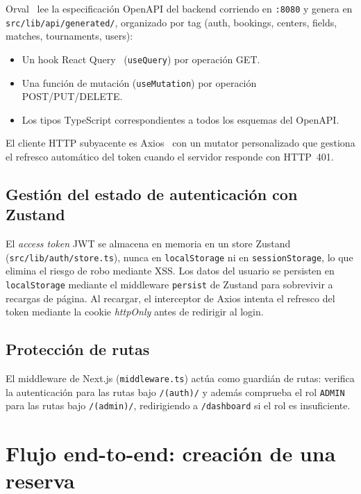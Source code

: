Orval~\cite{orval} lee la especificación OpenAPI del backend corriendo en \texttt{:8080} y
genera en \texttt{src/lib/api/generated/}, organizado por tag (auth, bookings,
centers, fields, matches, tournaments, users):

\begin{itemize}
  \item Un hook React Query~\cite{reactquery} (\texttt{useQuery}) por operación GET.
  \item Una función de mutación (\texttt{useMutation}) por operación
    POST/PUT/DELETE.
  \item Los tipos TypeScript correspondientes a todos los esquemas del OpenAPI.
\end{itemize}

El cliente HTTP subyacente es Axios~\cite{axios} con un mutator personalizado que gestiona
el refresco automático del token cuando el servidor responde con HTTP~401.

\subsection{Gestión del estado de autenticación con Zustand}

\begin{sloppypar}
El \textit{access token} JWT se almacena en memoria en un store
Zustand~\cite{zustand} (\texttt{src/lib/auth/store.ts}), nunca en
\texttt{localStorage} ni en \texttt{sessionStorage}, lo que elimina el riesgo
de robo mediante XSS. Los datos del usuario se persisten en \texttt{localStorage}
mediante el middleware \texttt{persist} de Zustand para sobrevivir a recargas
de página. Al recargar, el interceptor de Axios intenta el refresco del token
mediante la cookie \textit{httpOnly} antes de redirigir al login.
\end{sloppypar}

\subsection{Protección de rutas}

El middleware de Next.js (\texttt{middleware.ts}) actúa como guardián de rutas:
verifica la autenticación para las rutas bajo \texttt{/(auth)/} y además
comprueba el rol \texttt{ADMIN} para las rutas bajo \texttt{/(admin)/},
redirigiendo a \texttt{/dashboard} si el rol es insuficiente.

\section{Flujo end-to-end: creación de una reserva}
\label{sec:flujo_end_to_end}

